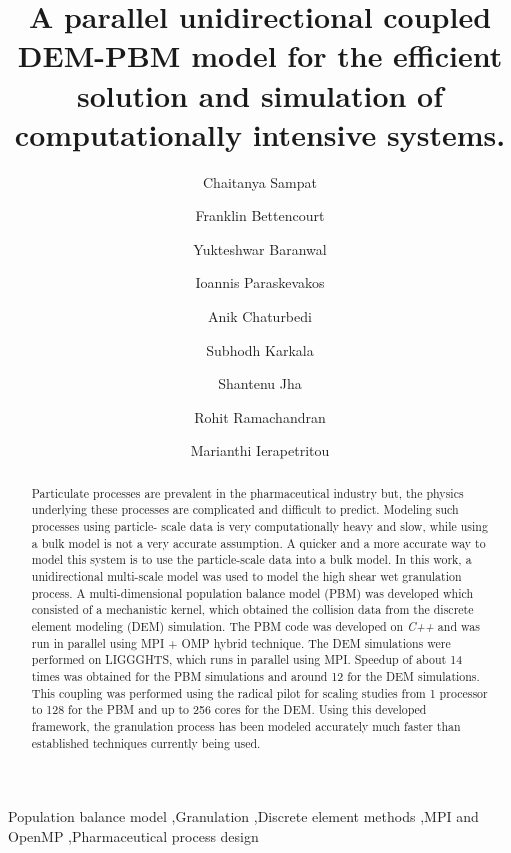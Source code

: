 \documentclass[preprint,11pt,authoryear]{elsarticle}
\begin{document}
\begin{frontmatter}

\title{A parallel unidirectional coupled DEM-PBM model for the efficient solution and simulation of 
computationally  intensive systems.}
\author[add1]{Chaitanya Sampat}
\author[add1]{Franklin Bettencourt}
\author[add1]{Yukteshwar Baranwal}
\author[add2]{Ioannis Paraskevakos}
\author[add1]{Anik Chaturbedi}
\author[add1]{Subhodh Karkala}
\author[add2]{Shantenu Jha}
\author[add1]{Rohit Ramachandran}
\author[add1]{Marianthi Ierapetritou}
\address[add1]{Department of Chemical and Biochemical Engineering, Rutgers, The State University of New
Jersey, Piscataway, NJ, USA-08854}
\address[add2]{Electrical and Computer Engineering, Rutgers, The State University of New Jersey, 
Piscataway, NJ, USA-08854}

\begin{abstract}
Particulate processes are prevalent in the pharmaceutical industry but, the physics underlying 
these processes are complicated and difficult to predict. Modeling such 
processes using particle-
scale data is very computationally heavy and slow, while using a bulk model is not a very accurate
assumption. A quicker and a more accurate way to model this system is to use the particle-scale data 
into a bulk model. In this work, a unidirectional multi-scale model was used to 
model the high shear wet granulation 
process. A multi-dimensional population balance model (PBM) was developed which 
consisted of a mechanistic kernel, which obtained the collision data from the discrete element 
modeling (DEM) simulation. The PBM code was developed on 
\textit{C++} and was run in parallel using MPI + OMP hybrid technique. The DEM 
simulations were performed on
LIGGGHTS, which runs in parallel using MPI. Speedup of about 14 times was obtained for the PBM 
simulations and around 12 for the DEM simulations. This coupling was performed using the radical 
pilot for scaling studies from 1 processor to 128 for the PBM and up to 256 cores for the DEM. Using 
this developed framework, the granulation process has been modeled accurately 
much faster than
established techniques currently being used.
\end{abstract}
\begin{keyword}
Population balance model \sep Granulation \sep Discrete element methods  \sep MPI and OpenMP 
\sep Pharmaceutical process design
\end{keyword}
\end{frontmatter}
\linenumbers
\end{document}
